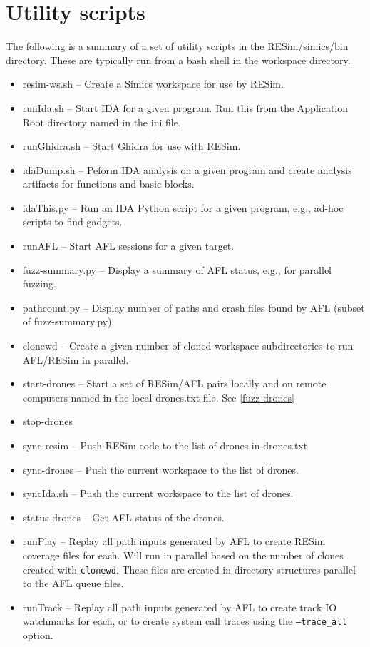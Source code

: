 \documentclass[titlepage]{article}
\begin{document}
\section{Utility scripts}
\label{utilities}
The following is a summary of a set of utility scripts in the RESim/simics/bin directory.
These are typically run from a bash shell in the workspace directory.  
\begin{itemize}
\item resim-ws.sh -- Create a Simics workspace for use by RESim.
\item runIda.sh -- Start IDA for a given program.  Run this from the Application Root directory named in the ini file.
\item runGhidra.sh -- Start Ghidra for use with RESim.
\item idaDump.sh -- Peform IDA analysis on a given program and create analysis artifacts for functions and basic blocks.
\item idaThis.py -- Run an IDA Python script for a given program, e.g., ad-hoc scripts to find gadgets.
\item runAFL -- Start AFL sessions for a given target.
\item fuzz-summary.py -- Display a summary of AFL status, e.g., for parallel fuzzing.
\item pathcount.py -- Display number of paths and crash files found by AFL (subset of fuzz-summary.py).
\item clonewd -- Create a given number of cloned workspace subdirectories to run AFL/RESim in parallel.
\item start-drones -- Start a set of RESim/AFL pairs locally and on remote computers named in the local drones.txt file. See \ref{fuzz-drones}
\item stop-drones
\item sync-resim -- Push RESim code to the list of drones in drones.txt
\item sync-drones -- Push the current workspace to the list of drones.
\item syncIda.sh -- Push the current workspace to the list of drones.
\item status-drones -- Get AFL status of the drones.
\item runPlay -- Replay all path inputs generated by AFL to create RESim coverage files for each.  Will run in parallel based on the number of clones created with {\tt clonewd}.
These files are created in directory structures parallel to the AFL queue files.
\item runTrack -- Replay all path inputs generated by AFL to create track IO watchmarks for each, or to create system call traces using the {\tt --trace\_all} option.  

\end{itemize}
\end{document}
